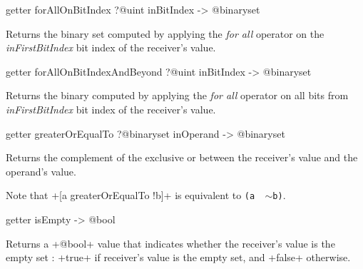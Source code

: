 
\begin{galgasbox}
getter forAllOnBitIndex ?@uint inBitIndex -> @binaryset
\end{galgasbox}

Returns the binary set computed by applying the \emph{for all} operator on the \emph{inFirstBitIndex} bit index of the receiver's value.








\begin{galgasbox}
getter forAllOnBitIndexAndBeyond ?@uint inBitIndex -> @binaryset
\end{galgasbox}


Returns the binary computed by applying the \emph{for all} operator on all bits from \emph{inFirstBitIndex} bit index of the receiver's value.









\begin{galgasbox}
getter greaterOrEqualTo ?@binaryset inOperand -> @binaryset
\end{galgasbox}


Returns the complement of the exclusive or between the receiver's value and the operand's value.

Note that \ggs+[a greaterOrEqualTo !b]+ is equivalent to \texttt{(a \textbar ~$\sim$b)}.









\begin{galgasbox}
getter isEmpty -> @bool
\end{galgasbox}

Returns a \ggs+@bool+ value that indicates whether the receiver's value is the empty set :  \ggs+true+ if receiver's value is the empty set, and \ggs+false+ otherwise.








